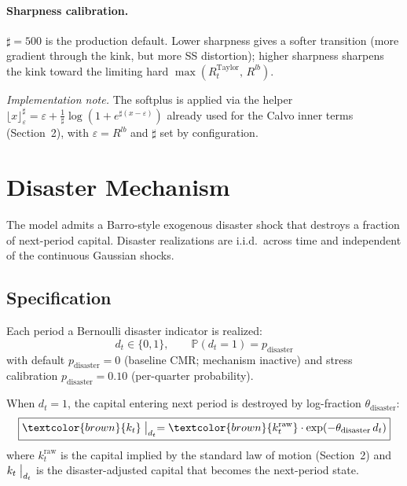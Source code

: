 \paragraph{Sharpness calibration.}
$\sharp = 500$ is the production default. Lower sharpness gives a
softer transition (more gradient through the kink, but more SS
distortion); higher sharpness sharpens the kink toward the limiting
hard $\max(R^{\text{Taylor}}_t,\, R^{lb})$.

\medskip
\noindent\emph{Implementation note.} The softplus is applied via the
helper $\lfloor x \rfloor_\varepsilon^{\sharp} = \varepsilon +
\frac{1}{\sharp}\log(1 + e^{\sharp(x - \varepsilon)})$ already used for
the Calvo inner terms (Section~2), with $\varepsilon = R^{lb}$ and
$\sharp$ set by configuration.


\section{Disaster Mechanism}
\label{sec:disaster}

The model admits a Barro-style exogenous disaster shock that destroys a
fraction of next-period capital. Disaster realizations are i.i.d.\ across
time and independent of the continuous Gaussian shocks.

\subsection{Specification}

Each period a Bernoulli disaster indicator is realized:
\begin{equation*}
  d_t \in \{0, 1\}, \qquad
  \mathbb{P}(d_t = 1) = p_{\text{disaster}}
\end{equation*}
with default $p_{\text{disaster}} = 0$ (baseline CMR; mechanism
inactive) and stress calibration $p_{\text{disaster}} = 0.10$
(per-quarter probability).

When $d_t = 1$, the capital entering next period is destroyed by
log-fraction $\theta_{\text{disaster}}$:
\begin{equation*}
  \boxed{\textcolor{brown}{k_t}\bigm|_{d_t}
    = \textcolor{brown}{k_t^{\text{raw}}}
      \cdot \exp(-\theta_{\text{disaster}}\, d_t)}
\end{equation*}
where $k_t^{\text{raw}}$ is the capital implied by the standard law of
motion (Section~2) and $k_t\bigm|_{d_t}$ is the disaster-adjusted
capital that becomes the next-period state.

